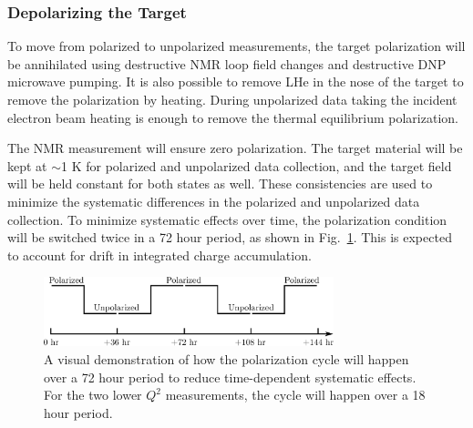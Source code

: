 \subsubsection{Depolarizing the Target}
To move from polarized to unpolarized measurements, the target
polarization will be annihilated using destructive NMR loop field changes and destructive DNP microwave pumping.
It is also possible to remove LHe in the nose of the target to remove the polarization by heating.
During unpolarized data taking the incident electron beam heating is enough to remove the thermal equilibrium polarization.

The NMR measurement will ensure zero polarization.  The target material will be
kept at $\sim$1 K for polarized and unpolarized data collection, and the target field
will be held constant for both states as well.  These
consistencies are used to minimize the systematic differences in the
polarized and unpolarized data collection.  To minimize systematic effects over
time, the polarization condition will be switched twice in a 72 hour period, as shown in Fig.~\ref{fig:polcycle}. 
This is expected to account for drift in integrated charge accumulation.

\begin{figure}
\centering
\includegraphics[width=0.75\textwidth,clip]{figs/pol_cycle.eps}
\caption{A visual demonstration of how the polarization cycle will happen over a 72 hour period to reduce time-dependent systematic effects. For the two lower $Q^2$ measurements, the cycle will happen over a 18 hour period.}  
\label{fig:polcycle}
\end{figure}



